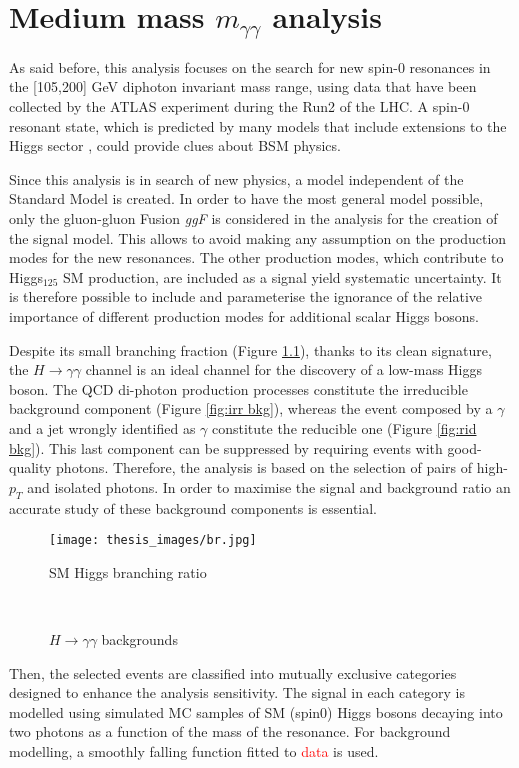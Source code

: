 \documentclass[a4paper, oneside, 11pt, openright]{book}
\begin{document}
 	\chapter{Medium mass $m_{\gamma\gamma}$ analysis}
 		As said before, this analysis focuses on the search for new spin-0 resonances in the [105,200] GeV diphoton invariant mass range, using data that have been collected by the ATLAS experiment during the Run2 of the LHC. A spin-0 resonant state, which is predicted by many models that include extensions to the Higgs sector \cite{BSM}, could provide clues about BSM physics. 	
 		
 		Since this analysis is in search of new physics, a model independent of the Standard Model is created. In order to have the most general model possible, only the gluon-gluon Fusion \textit{ggF} is considered in the analysis for the creation of the signal model. This allows to avoid making any assumption on the production modes for the new resonances. The other production modes, which contribute to Higgs$_{125}$ SM production, are included as a signal yield systematic uncertainty. It is therefore possible to include and parameterise the ignorance of the relative importance of different production modes for additional scalar Higgs bosons. 
 		
 	 	Despite its small branching fraction (Figure \ref{fig: br}), thanks to its clean signature, the $H\to\gamma\gamma$ channel is an ideal channel for the discovery of a low-mass Higgs boson. The QCD di-photon production processes constitute the irreducible background component (Figure \ref{fig:irr bkg}), whereas the event composed by a $\gamma$ and a jet wrongly identified as $\gamma$ constitute the reducible one (Figure \ref{fig:rid bkg}). This last component can be suppressed by requiring events with good-quality photons. Therefore, the analysis is based on the selection of pairs of high-$p_T$ and isolated photons. In order to maximise the signal and background ratio an accurate study of these background components is essential.
 		\begin{figure}
 			\centering
 			\texttt{[image: thesis\_images/br.jpg]}
 			\caption{SM Higgs branching ratio}
 			\label{fig: br}
 		\end{figure}
	 	\begin{figure}
	 		\centering
	 		\\				
	 		\caption{$H\rightarrow\gamma\gamma$ backgrounds}
	 		\label{fig:bkgs}
	 	\end{figure}
 		Then, the selected events are classified into mutually exclusive categories designed to enhance the analysis sensitivity. The signal in each category is modelled using simulated MC samples of SM (spin0) Higgs bosons decaying into two photons as a function of the mass of the resonance. For background modelling, a smoothly falling function fitted to \textcolor{red}{data} is used.
 		
\end{document}
